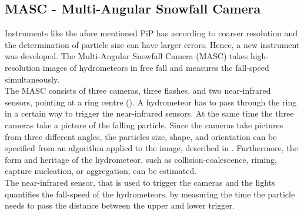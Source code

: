 \subsection{MASC - Multi-Angular Snowfall Camera}

Instruments like the afore mentioned PiP has according to \citet{garrett_fall_2012} coarser resolution and the determination of particle size can have larger errors. Hence, a new instrument was developed. The Multi-Angular Snowfall Camera (MASC) takes high-resolution images of hydrometeors in free fall and measures the fall-speed simultaneously. \\
The MASC consists of three cameras, three flashes, and two near-infrared sensors, pointing at a ring centre (). A hydrometeor has to pass through the ring in a certain way to trigger the near-infrared sensors. At the same time the three cameras take a picture of the falling particle. Since the cameras take pictures from three different angles, the particles size, shape, and orientation can be specified from an algorithm applied to the image, described in \citet{garrett_fall_2012}. Furthermore, the form and heritage of the hydrometeor, such as collision-coalescence, riming, capture nucleation, or aggregation, can be estimated. \\
The near-infrared sensor, that is used to trigger the cameras and the lights quantifies the fall-speed of the hydrometeors, by measuring the time the particle needs to pass the distance between the upper and lower trigger.    
